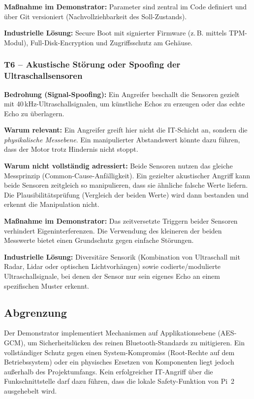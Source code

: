 \textbf{Maßnahme im Demonstrator:} Parameter sind zentral im Code definiert
und über Git versioniert (Nachvollziehbarkeit des Soll-Zustands).

\textbf{Industrielle Lösung:} Secure Boot mit signierter Firmware (z.\,B.
mittels TPM-Modul), Full-Disk-Encryption und Zugriffsschutz am Gehäuse.

\subsubsection*{T6 -- Akustische Störung oder Spoofing der Ultraschallsensoren}

\textbf{Bedrohung (Signal-Spoofing):} Ein Angreifer beschallt die Sensoren
gezielt mit 40\,kHz-Ultraschallsignalen, um künstliche Echos zu erzeugen oder
das echte Echo zu überlagern.

\textbf{Warum relevant:} Ein Angreifer greift hier nicht die IT-Schicht an,
sondern die \textit{physikalische Messebene}. Ein manipulierter
Abstandswert könnte dazu führen, dass der Motor trotz Hindernis nicht stoppt.

\textbf{Warum nicht vollständig adressiert:} Beide Sensoren nutzen das gleiche
Messprinzip (Common-Cause-Anfälligkeit). Ein gezielter akustischer Angriff kann beide Sensoren zeitgleich so manipulieren, dass
sie ähnliche falsche Werte liefern. Die Plausibilitätsprüfung (Vergleich der
beiden Werte) wird dann bestanden und erkennt die Manipulation nicht.

\textbf{Maßnahme im Demonstrator:} Das zeitversetzte Triggern beider Sensoren
verhindert Eigeninterferenzen. Die Verwendung des kleineren der beiden
Messwerte bietet einen Grundschutz gegen einfache Störungen.

\textbf{Industrielle Lösung:} Diversitäre Sensorik (Kombination von Ultraschall
mit Radar, Lidar oder optischen Lichtvorhängen) sowie codierte/modulierte
Ultraschallsignale, bei denen der Sensor nur sein eigenes Echo an einem
spezifischen Muster erkennt.

\subsection{Abgrenzung}
\label{subsec:security-abgrenzung}

Der Demonstrator implementiert Mechanismen auf Applikationsebene (AES-GCM), um
Sicherheitslücken des reinen Bluetooth-Standards zu mitigieren. Ein
vollständiger Schutz gegen einen System-Kompromiss (Root-Rechte auf dem
Betriebssystem) oder ein physisches Ersetzen von Komponenten liegt jedoch
außerhalb des Projektumfangs. Kein erfolgreicher IT-Angriff über die Funkschnittstelle darf dazu führen,
dass die lokale Safety-Funktion von Pi~2 ausgehebelt wird.
